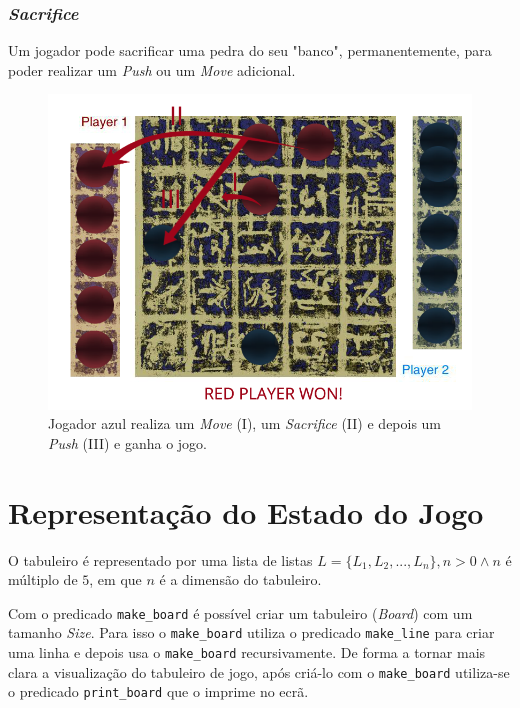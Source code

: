 \documentclass[a4paper]{article}
\begin{document}
\subsubsection{\textit{Sacrifice}}

Um jogador pode sacrificar uma pedra do seu "banco", permanentemente, para poder realizar um \textit{Push} ou um \textit{Move} adicional.

\begin{figure}[!htb]
	\centering
	\includegraphics[scale=0.3]{images/sacrifice.png}
	\caption{Jogador azul realiza um \textit{Move} (I), um \textit{Sacrifice} (II) e depois um \textit{Push} (III) e ganha o jogo.}
\end{figure}

\newpage

\section{Representação do Estado do Jogo}

O tabuleiro é representado por uma lista de listas  $L = \{L_1, L_2, ... , L_n\} , n > 0  \wedge n$ é múltiplo de $5$, em que $n$ é a dimensão do tabuleiro. \par
Com o predicado \texttt{make\_board} é possível criar um tabuleiro (\textit{Board}) com um tamanho \textit{Size}. Para isso o \texttt{make\_board} utiliza o predicado \texttt{make\_line} para criar uma linha e depois usa o \texttt{make\_board} recursivamente. De forma a tornar mais clara a visualização do tabuleiro de jogo, após criá-lo com o \texttt{make\_board} utiliza-se o predicado \texttt{print\_board} que o imprime no ecrã.
\end{document}
